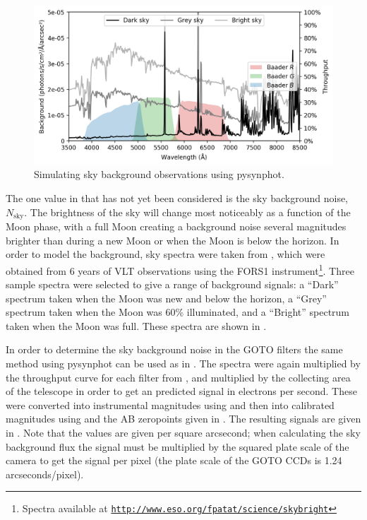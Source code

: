 \begin{colsection}
\begin{figure}[t]
    \begin{center}
        \includegraphics[width=\linewidth]{images/throughput/background.png}
    \end{center}
    \caption[Simulating sky background observations]{
        Simulating sky background observations using pysynphot.
    }\label{fig:background}
\end{figure}

The one value in  that has not yet been considered is the sky background noise, $N_\text{sky}$. The brightness of the sky will change most noticeably as a function of the Moon phase, with a full Moon creating a background noise several magnitudes brighter than during a new Moon or when the Moon is below the horizon. In order to model the background, sky spectra were taken from \citet{sky_background}, which were obtained from 6 years of VLT observations using the FORS1 instrument\footnote{Spectra available at \href{http://www.eso.org/~fpatat/science/skybright}{\texttt{http://www.eso.org/\raisebox{0.5ex}{\texttildelow}fpatat/science/skybright}}}. Three sample spectra were selected to give a range of background signals: a ``Dark'' spectrum taken when the Moon was new and below the horizon, a ``Grey'' spectrum taken when the Moon was 60\% illuminated, and a ``Bright'' spectrum taken when the Moon was full. These spectra are shown in .

In order to determine the sky background noise in the GOTO filters the same method using pysynphot can be used as in . The spectra were again multiplied by the throughput curve for each filter from , and multiplied by the collecting area of the telescope in order to get an predicted signal in electrons per second. These were converted into instrumental magnitudes using  and then into calibrated magnitudes using  and the AB zeropoints given in . The resulting signals are given in . Note that the values are given per square arcsecond; when calculating the sky background flux the signal must be multiplied by the squared plate scale of the camera to get the signal per pixel (the plate scale of the GOTO CCDs is 1.24 arcseconds/pixel).


\end{colsection}
